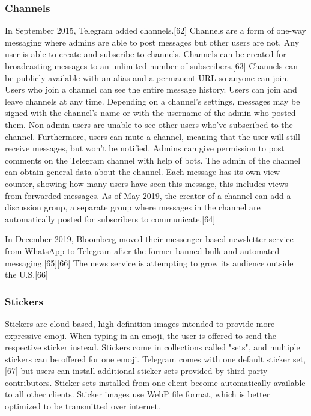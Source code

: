 \documentclass[12pt]{article}
\begin{document}
\subsubsection{Channels}



In September 2015, Telegram added channels.[62] Channels are a form of one-way messaging where admins are able to post messages but other users are not. Any user is able to create and subscribe to channels. Channels can be created for broadcasting messages to an unlimited number of subscribers.[63] Channels can be publicly available with an alias and a permanent URL so anyone can join. Users who join a channel can see the entire message history. Users can join and leave channels at any time. Depending on a channel's settings, messages may be signed with the channel's name or with the username of the admin who posted them. Non-admin users are unable to see other users who've subscribed to the channel. Furthermore, users can mute a channel, meaning that the user will still receive messages, but won't be notified. Admins can give permission to post comments on the Telegram channel with help of bots. The admin of the channel can obtain general data about the channel. Each message has its own view counter, showing how many users have seen this message, this includes views from forwarded messages. As of May 2019, the creator of a channel can add a discussion group, a separate group where messages in the channel are automatically posted for subscribers to communicate.[64]

In December 2019, Bloomberg moved their messenger-based newsletter service from WhatsApp to Telegram after the former banned bulk and automated messaging.[65][66] The news service is attempting to grow its audience outside the U.S.[66] 










\subsubsection{Stickers}




Stickers are cloud-based, high-definition images intended to provide more expressive emoji. When typing in an emoji, the user is offered to send the respective sticker instead. Stickers come in collections called "sets", and multiple stickers can be offered for one emoji. Telegram comes with one default sticker set,[67] but users can install additional sticker sets provided by third-party contributors. Sticker sets installed from one client become automatically available to all other clients. Sticker images use WebP file format, which is better optimized to be transmitted over internet. 
\end{document}
